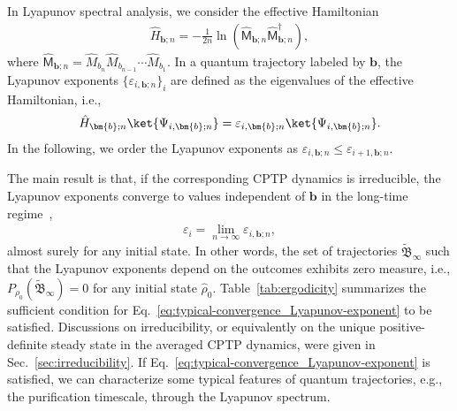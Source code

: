 \documentclass[preprint,pteplogo]{ptephy_v2}%
\numberwithin{equation}{section}
\theoremstyle{definition}
\begin{document}
In Lyapunov spectral analysis, we consider the effective Hamiltonian 
\begin{align}
    \hat{H}_{\bm{b};n}=-\frac{1}{2n}
    \ln\left(\hat{\mathsf{M}}_{\bm{b};n}\hat{\mathsf{M}}_{\bm{b};n}^\dagger\right),
    \label{eq:effective-Hamiltonian}
\end{align}
where $\hat{\mathsf{M}}_{\bm{b};n}=\hat{M}_{b_n}\hat{M}_{b_{n-1}}\cdots\hat{M}_{b_1}$. 
In a quantum trajectory labeled by $\bm{b}$, the Lyapunov exponents $\{\varepsilon_{i,\bm{b};n}\}_i$ are defined as the eigenvalues of the effective Hamiltonian, i.e., 
\begin{align}
    \hat{H}_{\bm{b};n}\ket{\Psi_{i,\bm{b};n}}
    =\varepsilon_{i,\bm{b};n}\ket{\Psi_{i,\bm{b};n}}.
    \label{eq:Lyapunov-exponent}
\end{align}
In the following, we order the Lyapunov exponents as $\varepsilon_{i,\bm{b};n}\leq\varepsilon_{i+1,\bm{b};n}$. 

The main result is that, if the corresponding CPTP dynamics is irreducible, the Lyapunov exponents converge to values independent of $\bm{b}$ in the long-time regime~\cite{benoist2019invariant, arnold1995random},
\begin{align}
    \varepsilon_i=\lim_{n\rightarrow\infty}\varepsilon_{i,\bm{b};n},
    \label{eq:typical-convergence_Lyapunov-exponent}
\end{align}
almost surely for any initial state. 
In other words, the set of trajectories $\tilde{\mathfrak{B}}_\infty$ such that the Lyapunov exponents depend on the outcomes exhibits zero measure, i.e., $P_{\rho_0}(\tilde{\mathfrak{B}}_\infty)=0$ for any initial state $\hat{\rho}_0$. 
Table~\ref{tab:ergodicity} summarizes the sufficient condition for Eq.~\eqref{eq:typical-convergence_Lyapunov-exponent} to be satisfied. 
Discussions on irreducibility, or equivalently on the unique positive-definite steady state in the averaged CPTP dynamics, were given in Sec.~\ref{sec:irreducibility}. 
If Eq.~\eqref{eq:typical-convergence_Lyapunov-exponent} is satisfied, we can characterize some typical features of quantum trajectories, e.g., the purification timescale, through the Lyapunov spectrum. 
\end{document}
